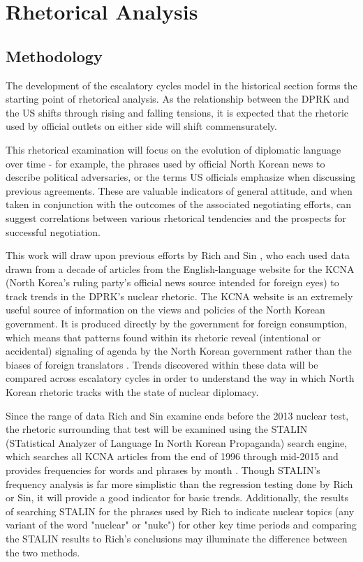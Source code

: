 \documentclass{article}
\begin{document}
\section{Rhetorical Analysis}

\subsection{Methodology}
The development of the escalatory cycles model in the historical section forms the starting point of rhetorical analysis. As the relationship between the DPRK and the US shifts through rising and falling tensions, it is expected that the rhetoric used by official outlets on either side will shift commensurately.

This rhetorical examination will focus on the evolution of diplomatic language over time - for example, the phrases used by official North Korean news to describe political adversaries, or the terms US officials emphasize when discussing previous agreements. These are valuable indicators of general attitude, and when taken in conjunction with the outcomes of the associated negotiating efforts, can suggest correlations between various rhetorical tendencies and the prospects for successful negotiation.

This work will draw upon previous efforts by Rich \cite{rich12, rich14} and Sin \cite{sin}, who each used data drawn from a decade of articles from the English-language website for the KCNA (North Korea's ruling party's official news source intended for foreign eyes) to track trends in the DPRK's nuclear rhetoric. The KCNA website is an extremely useful source of information on the views and policies of the North Korean government. It is produced directly by the government for foreign consumption, which means that patterns found within its rhetoric reveal (intentional or accidental) signaling of agenda by the North Korean government rather than the biases of foreign translators \cite{rich12}. Trends discovered within these data will be compared across escalatory cycles in order to understand the way in which North Korean rhetoric tracks with the state of nuclear diplomacy.

Since the range of data Rich and Sin examine ends before the 2013 nuclear test, the rhetoric surrounding that test will be examined using the STALIN (STatistical Analyzer of Language In North Korean Propaganda) search engine, which searches all KCNA articles from the end of 1996 through mid-2015 and provides frequencies for words and phrases by month \cite{stalin}. Though STALIN's frequency analysis is far more simplistic than the regression testing done by Rich or Sin, it will provide a good indicator for basic trends. Additionally, the results of searching STALIN for the phrases used by Rich to indicate nuclear topics (any variant of the word "nuclear" or "nuke") for other key time periods and comparing the STALIN results to Rich's conclusions may illuminate the difference between the two methods.
\end{document}
